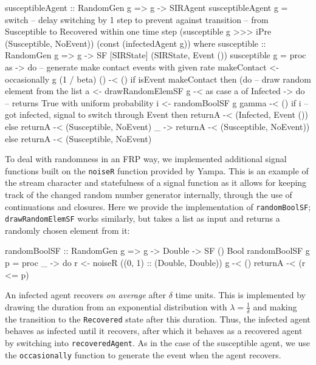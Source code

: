 \begin{HaskellCode}
susceptibleAgent :: RandomGen g => g -> SIRAgent
susceptibleAgent g 
    = switch 
      -- delay switching by 1 step to prevent against transition
      -- from Susceptible to Recovered within one time step
      (susceptible g >>> iPre (Susceptible, NoEvent)) 
      (const (infectedAgent g))
  where
    susceptible :: RandomGen g => g -> SF [SIRState] (SIRState, Event ())
    susceptible g = proc as -> do
      -- generate make contact events with given rate
      makeContact <- occasionally g (1 / beta) () -< ()
      if isEvent makeContact
        then (do
          -- draw random element from the list
          a <- drawRandomElemSF g -< as
          case a of
            Infected -> do
              -- returns True with uniform probability
              i <- randomBoolSF g gamma -< ()
              if i
                -- got infected, signal to switch through Event
                then returnA -< (Infected, Event ())
                else returnA -< (Susceptible, NoEvent)
             _       -> returnA -< (Susceptible, NoEvent))
        else returnA -< (Susceptible, NoEvent)
\end{HaskellCode}

To deal with randomness in an FRP way, we implemented additional signal functions built on the \texttt{noiseR} function provided by Yampa. This is an example of the stream character and statefulness of a signal function as it allows for keeping track of the changed random number generator internally, through the use of continuations and closures. Here we provide the implementation of \texttt{randomBoolSF}; \texttt{drawRandomElemSF} works similarly, but takes a list as input and returns a randomly chosen element from it:

\begin{HaskellCode}
randomBoolSF :: RandomGen g => g -> Double -> SF () Bool
randomBoolSF g p = proc _ -> do
  r <- noiseR ((0, 1) :: (Double, Double)) g -< ()
  returnA -< (r <= p)
\end{HaskellCode}

An infected agent recovers \textit{on average} after $\delta$ time units. This is implemented by drawing the duration from an exponential distribution \cite{borshchev_system_2004} with $\lambda = \frac{1}{\delta}$ and making the transition to the \texttt{Recovered} state after this duration. Thus, the infected agent behaves as infected until it recovers, after which it behaves as a recovered agent by switching into \texttt{recoveredAgent}. As in the case of the susceptible agent, we use the \texttt{occasionally} function to generate the event when the agent recovers.

